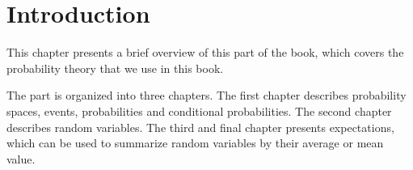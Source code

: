 \chapter{Introduction}
\label{ch:probability::introduction}

\begin{preamble}
This chapter presents a brief overview of this part of the book, which
covers the probability theory that we use in this book.
%

\end{preamble}


The part is organized into three chapters. 
%
The first chapter describes probability spaces, events, probabilities
and conditional probabilities.
%
The second chapter describes random variables.
%
The third and final chapter presents expectations, which can be used
to summarize random variables by their average or mean value.



